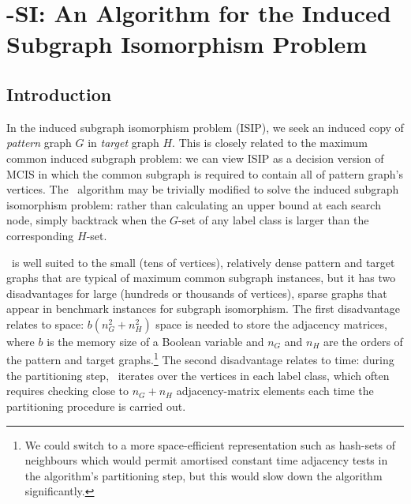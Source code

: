 
\newcommand{\varStartG}{\ensuremath{\AlgVar{start}_G}}
\newcommand{\varEndG}{\ensuremath{\AlgVar{end}_G}}
\newcommand{\varStartH}{\ensuremath{\AlgVar{start}_H}}
\newcommand{\varEndH}{\ensuremath{\AlgVar{end}_H}}
\newcommand{\varActive}{\ensuremath{\AlgVar{active}}}
\newcommand{\varSplitting}{\ensuremath{\AlgVar{splitting}}}
\newcommand{\varPrev}{\ensuremath{\AlgVar{prev}}}
\newcommand{\varNext}{\ensuremath{\AlgVar{next}}}
\newcommand{\labelClass}{\ensuremath{\AlgVar{labelClass}}}
\newcommand{\vertexPtr}{\ensuremath{\AlgVar{vertexPtr}}}
\newcommand{\calLC}{\ensuremath{\mathcal{LC}}}
\newcommand{\LC}{\ensuremath{\AlgVar{LC}}}
\newcommand{\Gptrs}{\ensuremath{P_G}}
\newcommand{\Hptrs}{\ensuremath{P_H}}
\newcommand{\Garray}{\ensuremath{A_G}}
\newcommand{\Harray}{\ensuremath{A_H}}

\chapter{\McSplit-SI: An Algorithm for the Induced Subgraph Isomorphism Problem}
\label{c:mcsplit-si}

\section{Introduction}

In the induced subgraph isomorphism problem (ISIP), we seek an induced copy of \emph{pattern} graph $G$ in \emph{target} graph $H$. This is closely related to the maximum common induced subgraph problem: we can view ISIP as a decision version of MCIS in which the common subgraph is required to contain all of pattern graph's vertices.
The \McSplit\ algorithm may be trivially modified to solve the induced subgraph isomorphism problem: rather than calculating an upper bound at each search node, simply backtrack when the $G$-set of any label class is larger than the corresponding $H$-set.

\McSplit\ is well suited to the small (tens of vertices), relatively dense pattern and target graphs that are typical of maximum common subgraph instances, but it has two disadvantages for large (hundreds or thousands of vertices), sparse graphs that appear in benchmark instances for subgraph isomorphism.  The first disadvantage relates to space: $b(n_G^2 + n_H^2)$ space is needed to store the adjacency matrices, where $b$ is the memory size of a Boolean variable and $n_G$ and $n_H$ are the orders of the pattern and target graphs.\footnote{We could switch to a more space-efficient representation such as hash-sets of neighbours which would permit amortised constant time adjacency tests in the algorithm's partitioning step, but this would slow down the algorithm significantly.}  The second disadvantage relates to time: during the partitioning step, \McSplit\ iterates over the vertices in each label class, which often requires checking close to $n_G + n_H$ adjacency-matrix elements each time the partitioning procedure is carried out.

